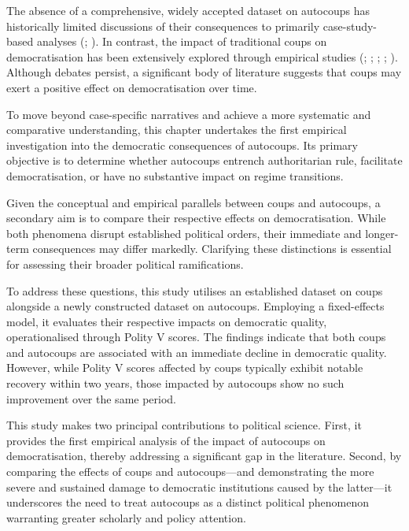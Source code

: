 \documentclass[
  12pt,
]{report}
\begin{document}
The absence of a comprehensive, widely accepted dataset on autocoups has
historically limited discussions of their consequences to primarily
case-study-based analyses (; ). In
contrast, the impact of traditional coups on democratisation has been
extensively explored through empirical studies
(;
;
;
;
). Although debates
persist, a significant body of literature suggests that coups may exert
a positive effect on democratisation over time.

To move beyond case-specific narratives and achieve a more systematic
and comparative understanding, this chapter undertakes the first
empirical investigation into the democratic consequences of autocoups.
Its primary objective is to determine whether autocoups entrench
authoritarian rule, facilitate democratisation, or have no substantive
impact on regime transitions.

Given the conceptual and empirical parallels between coups and
autocoups, a secondary aim is to compare their respective effects on
democratisation. While both phenomena disrupt established political
orders, their immediate and longer-term consequences may differ
markedly. Clarifying these distinctions is essential for assessing their
broader political ramifications.

To address these questions, this study utilises an established dataset
on coups alongside a newly constructed dataset on autocoups. Employing a
fixed-effects model, it evaluates their respective impacts on democratic
quality, operationalised through Polity V scores. The findings indicate
that both coups and autocoups are associated with an immediate decline
in democratic quality. However, while Polity V scores affected by coups
typically exhibit notable recovery within two years, those impacted by
autocoups show no such improvement over the same period.

This study makes two principal contributions to political science.
First, it provides the first empirical analysis of the impact of
autocoups on democratisation, thereby addressing a significant gap in
the literature. Second, by comparing the effects of coups and
autocoups---and demonstrating the more severe and sustained damage to
democratic institutions caused by the latter---it underscores the need
to treat autocoups as a distinct political phenomenon warranting greater
scholarly and policy attention.
\end{document}
